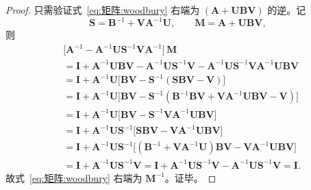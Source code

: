 \begin{proof}
只需验证式~\eqref{eq:矩阵:woodbury} 右端为 $(\boldsymbol{A}+\boldsymbol{U}\boldsymbol{B}\boldsymbol{V})$ 的逆。记
\[
\boldsymbol{S} = \boldsymbol{B}^{-1}+\boldsymbol{V}\boldsymbol{A}^{-1}\boldsymbol{U}, \qquad
\boldsymbol{M} = \boldsymbol{A}+\boldsymbol{U}\boldsymbol{B}\boldsymbol{V},
\]
则
\begin{align*}
&\big[\boldsymbol{A}^{-1}-\boldsymbol{A}^{-1}\boldsymbol{U}\boldsymbol{S}^{-1}\boldsymbol{V}\boldsymbol{A}^{-1}\big]\,\boldsymbol{M} \\
&= \boldsymbol{I}+\boldsymbol{A}^{-1}\boldsymbol{U}\boldsymbol{B}\boldsymbol{V}-\boldsymbol{A}^{-1}\boldsymbol{U}\boldsymbol{S}^{-1}\boldsymbol{V}-\boldsymbol{A}^{-1}\boldsymbol{U}\boldsymbol{S}^{-1}\boldsymbol{V}\boldsymbol{A}^{-1}\boldsymbol{U}\boldsymbol{B}\boldsymbol{V} \\
&= \boldsymbol{I}+\boldsymbol{A}^{-1}\boldsymbol{U}\big[\boldsymbol{B}\boldsymbol{V}-\boldsymbol{S}^{-1}(\boldsymbol{S}\boldsymbol{B}\boldsymbol{V}-\boldsymbol{V})\big] \\
&= \boldsymbol{I}+\boldsymbol{A}^{-1}\boldsymbol{U}\big[\boldsymbol{B}\boldsymbol{V}-\boldsymbol{S}^{-1}(\boldsymbol{B}^{-1}\boldsymbol{B}\boldsymbol{V}+\boldsymbol{V}\boldsymbol{A}^{-1}\boldsymbol{U}\boldsymbol{B}\boldsymbol{V}-\boldsymbol{V})\big] \\
&= \boldsymbol{I}+\boldsymbol{A}^{-1}\boldsymbol{U}\big[\boldsymbol{B}\boldsymbol{V}-\boldsymbol{S}^{-1}\boldsymbol{V}\boldsymbol{A}^{-1}\boldsymbol{U}\boldsymbol{B}\boldsymbol{V}\big] \\
&= \boldsymbol{I}+\boldsymbol{A}^{-1}\boldsymbol{U}\boldsymbol{S}^{-1}\big[\boldsymbol{S}\boldsymbol{B}\boldsymbol{V}-\boldsymbol{V}\boldsymbol{A}^{-1}\boldsymbol{U}\boldsymbol{B}\boldsymbol{V}\big] \\
&= \boldsymbol{I}+\boldsymbol{A}^{-1}\boldsymbol{U}\boldsymbol{S}^{-1}\big[(\boldsymbol{B}^{-1}+\boldsymbol{V}\boldsymbol{A}^{-1}\boldsymbol{U})\boldsymbol{B}\boldsymbol{V}-\boldsymbol{V}\boldsymbol{A}^{-1}\boldsymbol{U}\boldsymbol{B}\boldsymbol{V}\big] \\
&= \boldsymbol{I}+\boldsymbol{A}^{-1}\boldsymbol{U}\boldsymbol{S}^{-1}\boldsymbol{V} = \boldsymbol{I}+\boldsymbol{A}^{-1}\boldsymbol{U}\boldsymbol{S}^{-1}\boldsymbol{V}-\boldsymbol{A}^{-1}\boldsymbol{U}\boldsymbol{S}^{-1}\boldsymbol{V} = \boldsymbol{I}.
\end{align*}
故式~\eqref{eq:矩阵:woodbury} 右端为 $\boldsymbol{M}^{-1}$。证毕。
\end{proof}

